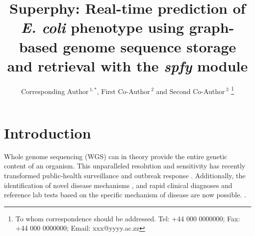 \documentclass[a4,center,fleqn]{NAR}
\begin{document}
\title{Superphy: Real-time prediction of \textit{E. coli} phenotype using graph-based genome sequence storage and retrieval with the \textit{spfy} module}

\author{%
Corresponding Author\,$^{1,*}$,
First Co-Author\,$^{2}$
and Second Co-Author\,$^2$%
\footnote{To whom correspondence should be addressed.
Tel: +44 000 0000000; Fax: +44 000 0000000; Email: xxx@yyyy.ac.zz}}

\address{%
$^{1}$Affiliation of Corresponding Author
and
$^{2}$Affiliation of Both Co-Authors}


\maketitle

\begin{abstract}

\end{abstract}


\section{Introduction}

Whole genome sequencing (WGS) can in theory provide the entire genetic content of an organism. This unparalleled resolution and sensitivity has recently transformed public-health surveillance and outbreak response \citep{ronholm2016navigating,lytsy2017time}. Additionally, the identification of novel disease mechanisms \citep{wang2014whole,yuen2015whole}, and rapid clinical diagnoses and reference lab tests based on the specific mechanism of disease are now possible. \citep{willig2015whole,dewey2014clinical}.
\end{document}
